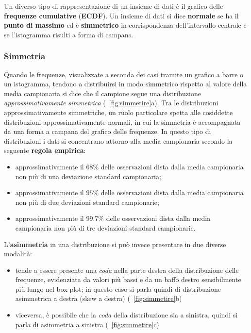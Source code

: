 \noindent Un diverso tipo di rappresentazione di un insieme di dati è il grafico delle \textbf{frequenze cumulative} (\textbf{ECDF}). Un insieme di dati si dice \textbf{normale} se ha il \textbf{punto di massimo} ed è \textbf{simmetrico} in corrispondenza dell'intervallo centrale e se l'istogramma risulti a forma di campana.

\subsubsection{Simmetria}
Quando le frequenze, visualizzate a seconda dei casi tramite un grafico a barre o un istogramma, tendono a distribuirsi in modo simmetrico rispetto al valore della media campionaria si dice che il campione segue una distribuzione \textit{approssimativamente simmetrica} (\figurename \ \ref{fig:simmetire}a). Tra le distribuzioni approssimativamente simmetriche, un ruolo particolare spetta alle cosiddette distribuzioni approssimativamente normali, in cui la simmetria è accompagnata da una forma a campana del grafico delle frequenze. In questo tipo di distribuzioni i dati si concentrano attorno alla media campionaria secondo la seguente \textbf{regola empirica}:
\begin{itemize}
    \item approssimativamente il $68\%$ delle osservazioni dista dalla media campionaria non più di una deviazione standard campionaria;
    \item approssimativamente il $95\%$ delle osservazioni dista dalla media campionaria non più di due deviazioni standard campionarie;
    \item approssimativamente il $99.7\%$ delle osservazioni dista dalla media campionaria non più di tre deviazioni standard campionarie.
\end{itemize}
L’\textbf{asimmetria} in una distribuzione si può invece presentare in due diverse modalità:
\begin{itemize}
    \item tende a essere presente una \textit{coda} nella parte destra della distribuzione delle frequenze,
    evidenziata da valori più bassi e da un baffo destro sensibilmente più lungo nel box plot; in questo caso si parla quindi di distribuzione asimmetrica a destra (skew a destra) (\figurename \ \ref{fig:simmetire}b)
    \item viceversa, è possibile che la \textit{coda} della distribuzione sia a sinistra, quindi si parla di asimmetria a sinistra (\figurename \ \ref{fig:simmetire}c)
\end{itemize}

